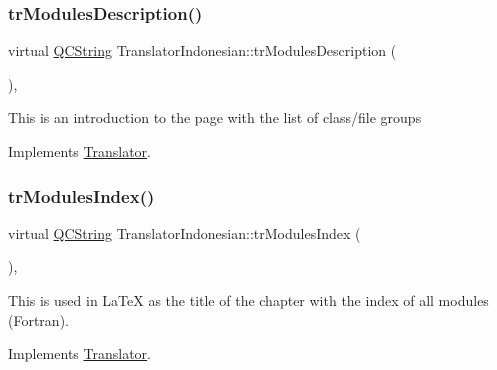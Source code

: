 \mbox{\label{class_translator_indonesian_ab1a6e9d2c29fddb51573886331e1c7ab}} 
\subsubsection{\texorpdfstring{trModulesDescription()}{trModulesDescription()}}
{\footnotesize\ttfamily virtual \mbox{\hyperlink{class_q_c_string}{Q\+C\+String}} Translator\+Indonesian\+::tr\+Modules\+Description (\begin{DoxyParamCaption}{ }\end{DoxyParamCaption})\hspace{0.3cm}{\ttfamily [inline]}, {\ttfamily [virtual]}}

This is an introduction to the page with the list of class/file groups 

Implements \mbox{\hyperlink{class_translator}{Translator}}.

\mbox{\label{class_translator_indonesian_a1e7fca54945ad1449d8af98b48e6d944}} 
\subsubsection{\texorpdfstring{trModulesIndex()}{trModulesIndex()}}
{\footnotesize\ttfamily virtual \mbox{\hyperlink{class_q_c_string}{Q\+C\+String}} Translator\+Indonesian\+::tr\+Modules\+Index (\begin{DoxyParamCaption}{ }\end{DoxyParamCaption})\hspace{0.3cm}{\ttfamily [inline]}, {\ttfamily [virtual]}}

This is used in La\+TeX as the title of the chapter with the index of all modules (Fortran). 

Implements \mbox{\hyperlink{class_translator}{Translator}}.

\mbox{\label{class_translator_indonesian_ac3ffc03b143cc7f78f813b9d6da8ac23}} 
